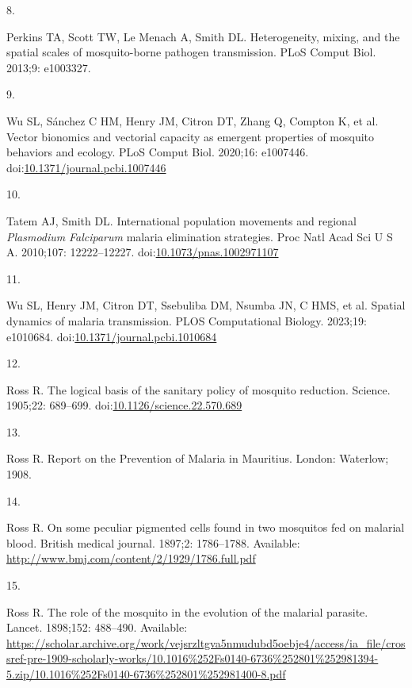 \documentclass[
]{book}
\newlength{\cslhangindent}
\newlength{\csllabelwidth}
\newenvironment{CSLReferences}[2] %
 {\begin{list}{}{%
  \setlength{\itemindent}{0pt}
  \setlength{\leftmargin}{0pt}
  \setlength{\parsep}{0pt}
  \ifodd #1
   \setlength{\leftmargin}{\cslhangindent}
   \setlength{\itemindent}{-1\cslhangindent}
  \fi
  \setlength{\itemsep}{#2\baselineskip}}}
 {\end{list}}
\newcommand{\CSLLeftMargin}[1]{\parbox[t]{\csllabelwidth}{\strut#1\strut}}
\newcommand{\CSLRightInline}[1]{\parbox[t]{\linewidth - \csllabelwidth}{\strut#1\strut}}
\begin{document}
\begin{CSLReferences}{0}{1}
\CSLLeftMargin{8. }%
\CSLRightInline{Perkins TA, Scott TW, Le Menach A, Smith DL. Heterogeneity, mixing, and the spatial scales of mosquito-borne pathogen transmission. PLoS Comput Biol. 2013;9: e1003327. }

\CSLLeftMargin{9. }%
\CSLRightInline{Wu SL, Sánchez C HM, Henry JM, Citron DT, Zhang Q, Compton K, et al. Vector bionomics and vectorial capacity as emergent properties of mosquito behaviors and ecology. PLoS Comput Biol. 2020;16: e1007446. doi:\href{https://doi.org/10.1371/journal.pcbi.1007446}{10.1371/journal.pcbi.1007446}}

\CSLLeftMargin{10. }%
\CSLRightInline{Tatem AJ, Smith DL. International population movements and regional {\emph{Plasmodium}}{ \emph{Falciparum}} malaria elimination strategies. Proc Natl Acad Sci U S A. 2010;107: 12222--12227. doi:\href{https://doi.org/10.1073/pnas.1002971107}{10.1073/pnas.1002971107}}

\CSLLeftMargin{11. }%
\CSLRightInline{Wu SL, Henry JM, Citron DT, Ssebuliba DM, Nsumba JN, C HMS, et al. Spatial dynamics of malaria transmission. PLOS Computational Biology. 2023;19: e1010684. doi:\href{https://doi.org/10.1371/journal.pcbi.1010684}{10.1371/journal.pcbi.1010684}}

\CSLLeftMargin{12. }%
\CSLRightInline{Ross R. The logical basis of the sanitary policy of mosquito reduction. Science. 1905;22: 689--699. doi:\href{https://doi.org/10.1126/science.22.570.689}{10.1126/science.22.570.689}}

\CSLLeftMargin{13. }%
\CSLRightInline{Ross R. Report on the {Prevention} of {Malaria} in {Mauritius}. {London}: {Waterlow}; 1908. }

\CSLLeftMargin{14. }%
\CSLRightInline{Ross R. On some peculiar pigmented cells found in two mosquitos fed on malarial blood. British medical journal. 1897;2: 1786--1788. Available: \url{http://www.bmj.com/content/2/1929/1786.full.pdf}}

\CSLLeftMargin{15. }%
\CSLRightInline{Ross R. The role of the mosquito in the evolution of the malarial parasite. Lancet. 1898;152: 488--490. Available: \url{https://scholar.archive.org/work/vejsrzltgva5nmudubd5oebje4/access/ia_file/crossref-pre-1909-scholarly-works/10.1016\%252Fs0140-6736\%252801\%252981394-5.zip/10.1016\%252Fs0140-6736\%252801\%252981400-8.pdf}}


\end{CSLReferences}
\end{document}

